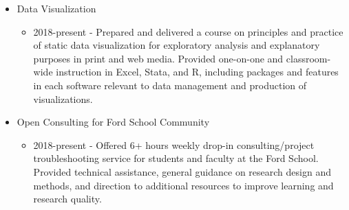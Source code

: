 \documentclass[10pt,letterpaper,unicode]{moderncv}        %
\newenvironment{mcvitemize}
{%
    \addtolength{\leftmargini}{\dimexpr\hintscolumnwidth+\separatorcolumnwidth}
    \small
    \begin{itemize}
}{%
    \end{itemize}
}
\begin{document}
\begin{mcvitemize}
\begin{itemize}
		\end{itemize}
	\item Data Visualization
		\begin{itemize}
			\item 2018-present - Prepared and delivered a course on principles and practice of static data visualization for exploratory analysis and explanatory purposes in print and web media. Provided one-on-one and classroom-wide instruction in Excel, Stata, and R, including packages and features in each software relevant to data management and production of visualizations.
		\end{itemize}
	\item Open Consulting for Ford School Community
		\begin{itemize}
			\item 2018-present - Offered 6+ hours weekly drop-in consulting/project troubleshooting service for students and faculty at the Ford School. Provided technical assistance, general guidance on research design and methods, and direction to additional resources to improve learning and research quality.
		\end{itemize}
\end{mcvitemize}
\end{document}
